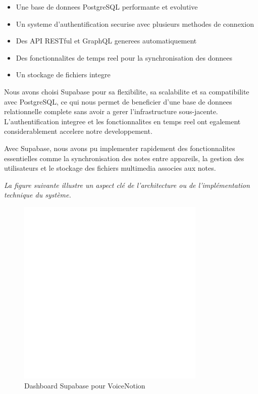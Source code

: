 \begin{itemize}
    \item Une base de donnees PostgreSQL performante et evolutive
    \item Un systeme d'authentification securise avec plusieurs methodes de connexion
    \item Des API RESTful et GraphQL generees automatiquement
    \item Des fonctionnalites de temps reel pour la synchronisation des donnees
    \item Un stockage de fichiers integre
\end{itemize}

Nous avons choisi Supabase pour sa flexibilite, sa scalabilite et sa compatibilite avec PostgreSQL, ce qui nous permet de beneficier d'une base de donnees relationnelle complete sans avoir a gerer l'infrastructure sous-jacente. L'authentification integree et les fonctionnalites en temps reel ont egalement considerablement accelere notre developpement.

Avec Supabase, nous avons pu implementer rapidement des fonctionnalites essentielles comme la synchronisation des notes entre appareils, la gestion des utilisateurs et le stockage des fichiers multimedia associes aux notes.

\noindent
\textit{La figure suivante illustre un aspect clé de l'architecture ou de l'implémentation technique du système.}
\begin{figure}[H]
\centering
\includegraphics[width=0.8\textwidth]{assets/docs/supabase_dashboard.png}
\caption{Dashboard Supabase pour VoiceNotion}
\label{fig:supabase-dashboard}
\end{figure}

